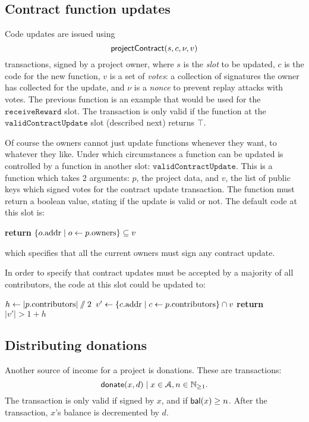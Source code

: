 \subsection{Contract function updates}

Code updates are issued using
\[
    \mathsf{projectContract}\small{\lparen s, c, \nu, v\rparen}
\]
transactions, signed by a project owner, where $s$ is the \emph{slot} to be
updated, $c$ is the code for the new function, $v$ is a set of \emph{votes}: a
collection of signatures the owner has collected for the update, and $\nu$ is a
\emph{nonce} to prevent replay attacks with votes. The previous function is an
example that would be used for the $\mathtt{receiveReward}$ slot. The
transaction is only valid if the function at the $\mathtt{validContractUpdate}$
slot (described next) returns $\top$.

Of course the owners cannot just update functions whenever they want, to
whatever they like. Under which circumstances a function can be updated is
controlled by a function in another slot: $\mathtt{validContractUpdate}$. This
is a function which takes 2 arguments: $p$, the project data, and $v$, the list
of public keys which signed votes for the contract update transaction. The
function must return a boolean value, stating if the update is valid or not. The
default code at this slot is:
\begin{algorithmic}[0]
        \State \textbf{return} $\{ o.{\mathrm{addr}} \mid o \gets p.{\mathrm{owners}} \} \subseteq v$
    \EndProcedure
\end{algorithmic}
which specifies that all the current owners must sign any contract update.

In order to specify that contract updates must be accepted by a majority of all
contributors, the code at this slot could be updated to:
\medskip
\begin{algorithmic}[0]
        \State $h \gets |p.{\mathrm{contributors}}| \sslash 2$
        \State $v' \gets \{ c.{\mathrm{addr}} \mid c \gets p.{\mathrm{contributors}} \} \cap v$
        \State \textbf{return} $|v'| > 1 + h$
    \EndProcedure
\end{algorithmic}

\subsection{Distributing donations}

Another source of income for a project is donations. These are transactions:
\[
\mathsf{donate}\small{\lparen x, d\rparen} \mid x \in \mathcal{A}, n \in \mathbb{N}_{\geq 1}.
\]
The transaction is only valid if signed by $x$, and if $\mathsf{bal}(x) \geq n$. After
the transaction, $x$'s balance is decremented by $d$.

